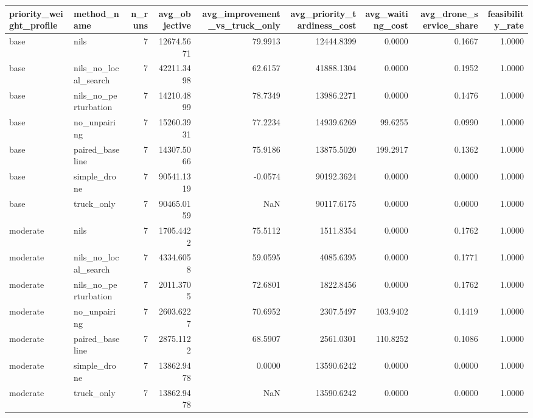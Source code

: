 \begin{tabular}{llrrrrrrr}
\toprule
priority_weight_profile & method_name & n_runs & avg_objective & avg_improvement_vs_truck_only & avg_priority_tardiness_cost & avg_waiting_cost & avg_drone_service_share & feasibility_rate \\
\midrule
base & nils & 7 & 12674.5671 & 79.9913 & 12444.8399 & 0.0000 & 0.1667 & 1.0000 \\
base & nils_no_local_search & 7 & 42211.3498 & 62.6157 & 41888.1304 & 0.0000 & 0.1952 & 1.0000 \\
base & nils_no_perturbation & 7 & 14210.4899 & 78.7349 & 13986.2271 & 0.0000 & 0.1476 & 1.0000 \\
base & no_unpairing & 7 & 15260.3931 & 77.2234 & 14939.6269 & 99.6255 & 0.0990 & 1.0000 \\
base & paired_baseline & 7 & 14307.5066 & 75.9186 & 13875.5020 & 199.2917 & 0.1362 & 1.0000 \\
base & simple_drone & 7 & 90541.1319 & -0.0574 & 90192.3624 & 0.0000 & 0.0000 & 1.0000 \\
base & truck_only & 7 & 90465.0159 & NaN & 90117.6175 & 0.0000 & 0.0000 & 1.0000 \\
moderate & nils & 7 & 1705.4422 & 75.5112 & 1511.8354 & 0.0000 & 0.1762 & 1.0000 \\
moderate & nils_no_local_search & 7 & 4334.6058 & 59.0595 & 4085.6395 & 0.0000 & 0.1771 & 1.0000 \\
moderate & nils_no_perturbation & 7 & 2011.3705 & 72.6801 & 1822.8456 & 0.0000 & 0.1762 & 1.0000 \\
moderate & no_unpairing & 7 & 2603.6227 & 70.6952 & 2307.5497 & 103.9402 & 0.1419 & 1.0000 \\
moderate & paired_baseline & 7 & 2875.1122 & 68.5907 & 2561.0301 & 110.8252 & 0.1086 & 1.0000 \\
moderate & simple_drone & 7 & 13862.9478 & 0.0000 & 13590.6242 & 0.0000 & 0.0000 & 1.0000 \\
moderate & truck_only & 7 & 13862.9478 & NaN & 13590.6242 & 0.0000 & 0.0000 & 1.0000 \\
\bottomrule
\end{tabular}
